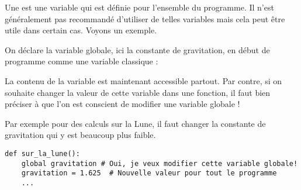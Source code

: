 \documentclass[11pt,class=report,crop=false]{standalone}
\begin{document}


\begin{cours}


Une  est une variable qui est définie pour l'ensemble du programme. Il n'est généralement pas recommandé d'utiliser de telles variables mais cela peut être utile dans certain cas. Voyons un exemple.

On déclare la variable globale, ici la constante de gravitation, en début de programme comme une variable classique : \\
\centerline{}

La contenu de la variable  est maintenant accessible partout.
Par contre, si on souhaite changer la valeur de cette variable dans une fonction, il faut bien préciser à \Python{} que l'on est conscient de modifier une variable globale !

Par exemple pour des calculs sur la Lune, il faut changer la constante de gravitation qui y est beaucoup plus faible.

\begin{lstlisting}
def sur_la_lune():
    global gravitation # Oui, je veux modifier cette variable globale!
    gravitation = 1.625  # Nouvelle valeur pour tout le programme    
    ...
\end{lstlisting}

\end{cours}


\end{document}
